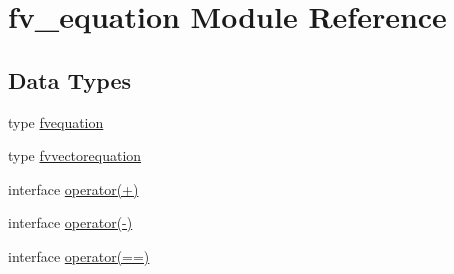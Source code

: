 \hypertarget{classfv__equation}{\section{fv\-\_\-equation Module Reference}
\label{classfv__equation}
}
\subsection*{Data Types}
\begin{DoxyCompactItemize}
\item 
type \hyperlink{structfv__equation_1_1fvequation}{fvequation}
\item 
type \hyperlink{structfv__equation_1_1fvvectorequation}{fvvectorequation}
\item 
interface \hyperlink{interfacefv__equation_1_1operator_07_09_08}{operator(+)}
\item 
interface \hyperlink{interfacefv__equation_1_1operator_07-_08}{operator(-\/)}
\item 
interface \hyperlink{interfacefv__equation_1_1operator_07_0A_0A_08}{operator(==)}
\end{DoxyCompactItemize}
